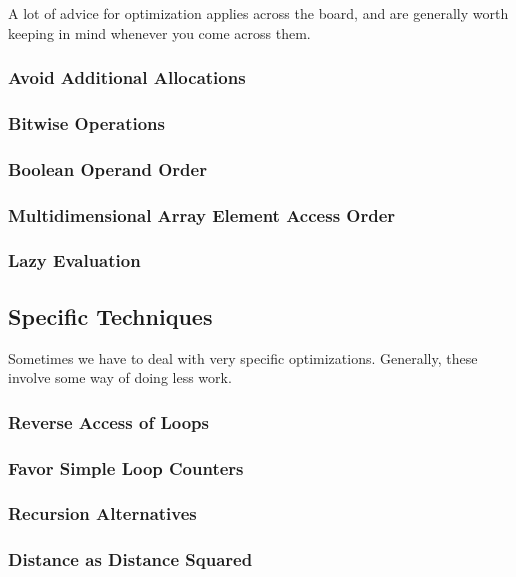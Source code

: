 A lot of advice for optimization applies across the board, and are generally worth keeping in mind whenever you come across them.

\subsubsection{Avoid Additional Allocations}

\subsubsection{Bitwise Operations}

\subsubsection{Boolean Operand Order}

\subsubsection{Multidimensional Array Element Access Order}

\subsubsection{Lazy Evaluation}

\subsection{Specific Techniques}

Sometimes we have to deal with very specific optimizations. Generally, these involve some way of doing less work.

\subsubsection{Reverse Access of Loops}

\subsubsection{Favor Simple Loop Counters}

\subsubsection{Recursion Alternatives}

\subsubsection{Distance as Distance Squared}

